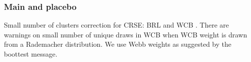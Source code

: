\subsubsection{Main and placebo}

Small number of clusters correction for CRSE: BRL \citep{PustejovskyTipton2018} and WCB \citep{CameronGelbachMiller2008}. There are warnings on small number of unique draws in WCB when WCB weight is drawn from a Rademacher distribution. We use Webb weights as suggested by the \textsf{boottest} message. 
